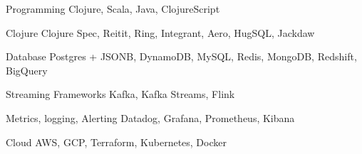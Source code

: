 

\begin{cvskills}

  \cvskill
    {Programming} %
    {Clojure, Scala, Java, ClojureScript} %
    
  \cvskill
    {Clojure} %
    {Clojure Spec, Reitit, Ring, Integrant, Aero, HugSQL, Jackdaw} %

  \cvskill
    {Database} %
    {Postgres + JSONB, DynamoDB, MySQL, Redis, MongoDB, Redshift, BigQuery} %

  \cvskill
    {Streaming Frameworks} %
    {Kafka, Kafka Streams, Flink} %

  \cvskill
    {Metrics, logging, Alerting} %
    {Datadog, Grafana, Prometheus, Kibana} %
    
  \cvskill
    {Cloud} %
    {AWS, GCP, Terraform, Kubernetes, Docker} %

\end{cvskills}


